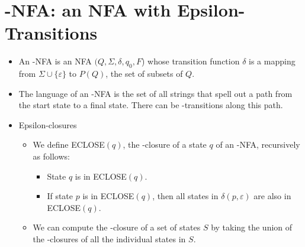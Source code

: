 \documentclass[]{article}
\begin{document}
\section{\textepsilon-NFA: an NFA with Epsilon-Transitions}
  \begin{itemize}
    \item An \textepsilon-NFA is an NFA $(Q, \Sigma, \delta, q_0, F$) whose
    transition function $\delta$ is a mapping from
    $\Sigma \cup \{ \varepsilon \}$ to $P(Q)$, the set of subsets of $Q$.
    \item The language of an \textepsilon-NFA is the set of all strings that
    spell out a path from the start state to a final state. There can be
    \textepsilon-transitions along this path.
    \item Epsilon-closures
      \begin{itemize}
        \item We define ECLOSE$(q)$, the \textepsilon-closure of a state $q$ of
        an \textepsilon-NFA, recursively as follows:
          \begin{itemize}
            \item State $q$ is in ECLOSE$(q)$.
            \item If state $p$ is in ECLOSE$(q)$, then all states in $\delta(p,
            \varepsilon)$ are also in ECLOSE$(q)$.
          \end{itemize}
        \item We can compute the \textepsilon-closure of a set of states $S$ by
        taking the union of the \textepsilon-closures of all the individual
        states in $S$.
      \end{itemize}
  \end{itemize}
\end{document}
